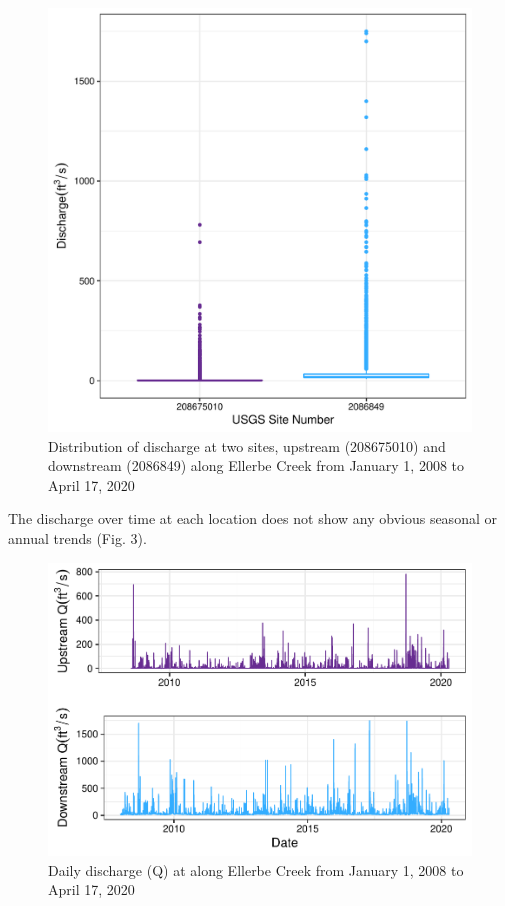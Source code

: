 \documentclass[12pt,]{article}
\begin{document}
\begin{figure}
\centering
\includegraphics{Landman_ENV872_Project_files/figure-latex/Exploratory Analysis Figure 2-1.pdf}
\caption{Distribution of discharge at two sites, upstream (208675010)
and downstream (2086849) along Ellerbe Creek from January 1, 2008 to
April 17, 2020}
\end{figure}

\newpage

The discharge over time at each location does not show any obvious
seasonal or annual trends (Fig. 3).

\begin{figure}
\centering
\includegraphics{Landman_ENV872_Project_files/figure-latex/Exploratory Analysis Figure 3-1.pdf}
\caption{Daily discharge (Q) at along Ellerbe Creek from January 1, 2008
to April 17, 2020}
\end{figure}
\end{document}
